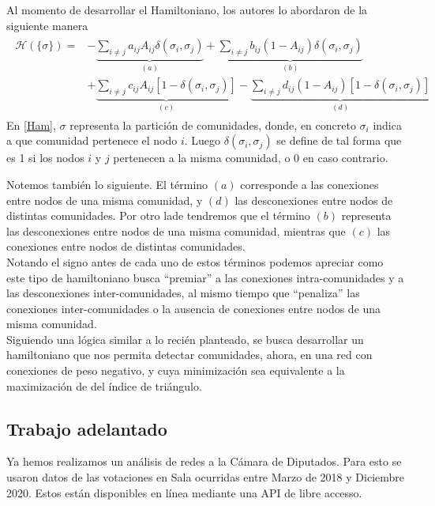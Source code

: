 \documentclass{proyectotesis}
\begin{document}
Al momento de desarrollar el Hamiltoniano, los autores lo abordaron de la siguiente manera
\begin{align}
\begin{split}
    \mathcal{H}(\{\sigma\}) = &- \underbrace{\sum_{i\neq j} a_{ij}A_{ij}\delta(\sigma_i,\sigma_j)}_{(a)} + \underbrace{\sum_{i\neq j} b_{ij}(1 - A_{ij})\delta(\sigma_i,\sigma_j)}_{(b)} \\
                              &+ \underbrace{\sum_{i\neq j} c_{ij} A_{ij}[1 - \delta(\sigma_i,\sigma_j)] }_{(c)} - \underbrace{\sum_{i\neq j} d_{ij} (1-A_{ij})[1 - \delta(\sigma_i,\sigma_j)]}_{(d)}
\end{split}
\label{Ham}
\end{align}
En \eqref{Ham}, $\sigma$ representa la partición de comunidades, donde, en concreto $\sigma_i$ indica a que comunidad pertenece el nodo $i$. Luego $\delta(\sigma_i,\sigma_j)$ se define de tal forma que es 1 si los nodos $i$ y $j$ pertenecen a la misma comunidad, o 0 en caso contrario.

Notemos también lo siguiente. El término $(a)$ corresponde a las conexiones entre nodos de una misma comunidad, y $(d)$ las desconexiones entre nodos de distintas comunidades. Por otro lade tendremos que el término  $(b)$ representa las desconexiones entre nodos de una misma comunidad, mientras que $(c)$ las conexiones entre nodos de distintas comunidades.\\

Notando el signo antes de cada uno de estos términos podemos apreciar como este tipo de hamiltoniano busca ``premiar'' a las conexiones intra-comunidades y a las desconexiones inter-comunidades, al mismo tiempo que ``penaliza'' las conexiones inter-comunidades o la ausencia de conexiones entre nodos de una misma comunidad.
\\

Siguiendo una lógica similar a lo recién planteado, se busca desarrollar un hamiltoniano que nos permita detectar comunidades, ahora, en una red con conexiones de peso negativo, y cuya minimización sea equivalente a la maximización de del índice de triángulo.

\subsection{Trabajo adelantado}
Ya hemos realizamos un análisis de redes a la Cámara de Diputados. Para esto se usaron datos de las votaciones en Sala ocurridas entre Marzo de 2018 y Diciembre 2020. Estos están disponibles en línea mediante una API de libre accesso. 
\end{document}
